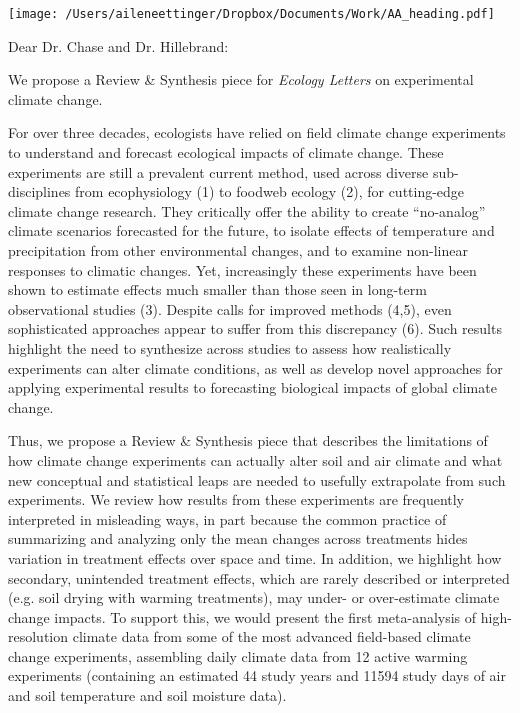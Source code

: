 \documentclass[11pt,a4paper]{letter}
\begin{document}


\begin{letter}{}
\texttt{[image: /Users/aileneettinger/Dropbox/Documents/Work/AA\_heading.pdf]}

\opening{Dear Dr. Chase and Dr. Hillebrand:}
We propose a  Review \& Synthesis piece for \emph{Ecology Letters} on experimental climate change. 

For over three decades, ecologists have relied on field climate change experiments to understand and forecast ecological impacts of climate change. These experiments are still a prevalent current method, used across diverse sub-disciplines from ecophysiology (1) %
to foodweb ecology (2), %
for cutting-edge climate change research. They critically offer the ability to create ``no-analog'' climate scenarios forecasted for the future, to isolate effects of temperature and precipitation from other environmental changes, and to examine non-linear responses to climatic changes. Yet, increasingly these experiments have been shown to estimate effects much smaller than those seen in long-term observational studies (3). %
Despite calls for improved methods (4,5), %
even sophisticated approaches appear to suffer from this discrepancy (6). %
Such results highlight the need to synthesize across studies to assess how realistically experiments can alter climate conditions, as well as develop novel approaches for applying experimental results to forecasting biological impacts of global climate change. 

Thus, we propose a Review \& Synthesis piece that describes the limitations of how climate change experiments can actually alter soil and air climate and what new conceptual and statistical leaps are needed to usefully extrapolate from such experiments. We review how results from these experiments are frequently interpreted in misleading ways, in part because the common practice of summarizing and analyzing only the mean changes across treatments hides variation in treatment effects over space and time. In addition, we highlight how secondary, unintended treatment effects, which are rarely described or interpreted (e.g. soil drying with warming treatments), may under- or over-estimate climate change impacts. To support this, we would present the first meta-analysis of high-resolution climate data from some of the most advanced field-based climate change experiments, assembling daily climate data from 12 active warming experiments (containing an estimated 44 study years and 11594 study days of air and soil temperature and soil moisture data). %


\end{letter}
\end{document}
